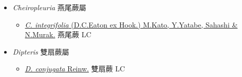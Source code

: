 
  \begin{itemize}
 \item[    ] \textit{Cheiropleuria} 燕尾蕨屬
                                
  \begin{itemize}
        \item[] \href{http://www.theplantlist.org/tpl1.1/search?q=Cheiropleuria+integrifolia}{\textit{C. integrifolia} (D.C.Eaton ex Hook.) M.Kato, Y.Yatabe, Sahashi \& N.Murak.}   燕尾蕨   LC
  \end{itemize}
 \item[    ] \textit{Dipteris} 雙扇蕨屬
                                
  \begin{itemize}
        \item[] \href{http://www.theplantlist.org/tpl1.1/search?q=Dipteris+conjugata}{\textit{D. conjugata} Reinw.}   雙扇蕨   LC
  \end{itemize}
  \end{itemize}
